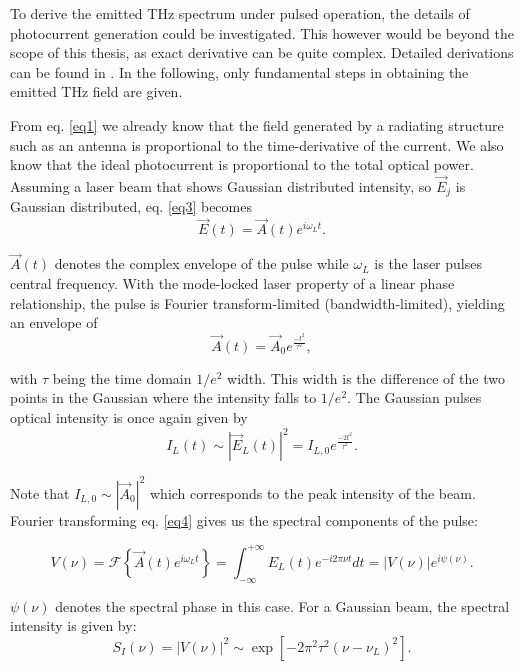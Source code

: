 To derive the emitted THz spectrum under pulsed operation, the details of photocurrent generation could be investigated. This however would be beyond the scope of this thesis, as exact derivative can be quite complex. Detailed derivations can be found in \cite{preuPrinciplesTHzGeneration2015}. In the following, only fundamental steps in obtaining the emitted THz field are given.

From eq. \eqref{eq1} we already know that the field generated by a radiating structure such as an antenna is proportional to the time-derivative of the current. We also know that the ideal photocurrent is proportional to the total optical power. Assuming a laser beam that shows Gaussian distributed intensity, so $\vec{E}_j$ is Gaussian distributed, eq. \eqref{eq3} becomes
\begin{equation}
	\vec{E}(t) = \vec{A}(t)e^{i\omega_Lt}.
\label{eq4} 
\end{equation}

$\vec{A}(t)$ denotes the complex envelope of the pulse while $\omega_L$ is the laser pulses central frequency. With the mode-locked laser property of a linear phase relationship, the pulse is Fourier transform-limited (bandwidth-limited), yielding an envelope of
\begin{equation}
	\vec{A}(t) = \vec{A}_0 e^{\frac{-t^2}{\tau^2}},
\end{equation}

with $\tau$ being the time domain $1/e^2$ width. This width is the difference of the two points in the Gaussian where the intensity falls to $1/e^2$. The Gaussian pulses optical intensity is once again given by
\begin{equation}
	I_L(t) \sim |\vec{E}_L(t)|^2 = I_{L,0}e^{\frac{-2t^2}{\tau ^2}}.
\end{equation} 

Note that $I_{L,0} \sim |\vec{A}_0|^2$ which corresponds to the peak intensity of the beam. 
Fourier transforming eq. \eqref{eq4} gives us the spectral components of the pulse:

\begin{equation}
	V(\nu) =  \mathcal{F}\left\{\vec{A}(t)e^{i\omega_Lt} \right\}
	= \int_{-\infty}^{+\infty}E_L(t)e^{-i2\pi\nu t}dt = |V(\nu)|e^{i\psi(\nu)}.
\end{equation}

$\psi(\nu)$ denotes the spectral phase in this case. For a Gaussian beam, the spectral intensity is given by:
\begin{equation}
	S_I(\nu) = |V(\nu)|^2 \sim \exp[-2\pi^2\tau^2(\nu - \nu_L)^2]. 
\end{equation}

